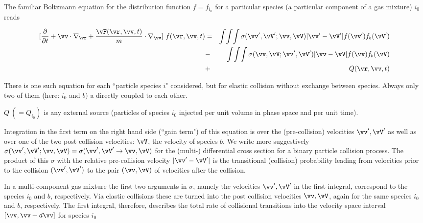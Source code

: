 The familiar Boltzmann
equation for the distribution function $f=f_{i_0}$ for a particular species (a particular component of a gas mixture) $i_0$
reads

\renewcommand{\theequation}{1.1a}
\begin{eqnarray} \label{eq1a}
\lbrack\frac\partial{\partial t} + \vv \cdot
\nabla_{\vr} +
\frac{\vF(\vr,\vv,t)}{m} \cdot
\nabla_{\vv}\rbrack \ f(\vr,\vv,t)
& = &
\int\!\int\!\int
\sigma(\vv',\vV';\vv,\vV)
|\vv'-\vV'| f(\vv')
f_b(\vV')  \nonumber \\
& - & \int\!\int\!\int
\sigma(\vv,\vV;\vv',\vV')
|\vv-\vV| f(\vv) f_b(\vV)
\nonumber \\  &+  & Q(\vr,\vv,t)
\end{eqnarray}

\renewcommand{\theequation}{\arabic{section}.\arabic{equation}}
There is one such equation for each ``particle species $i$" considered, but for elastic collision
without exchange between species. Always only two of them (here: $i_0$ and $b$) a directly coupled to each other.


$Q \ (= Q_{i_0})$ is any external source (particles of species $i_0$ injected per unit volume  in phase space and per unit time).
\

Integration in the first term on the right hand side (``gain term") of this equation is over the (pre-collision) velocities $\vv',
\vV'$  as well as over one of the two post collision velocities: $\vV$, the velocity of species $b$.
We write more suggestively  $\sigma(\vv',\vV'; \vv,\vV) = \sigma(\vv',\vV' \rightarrow \vv,\vV)$
for the (multi-) differential cross section for a binary particle collision process. The product of this $\sigma$ with the relative pre-collision velocity
$|\vv'-\vV'|$ is the transitional (collision) probability leading from velocities prior to the collision $(\vv',\vV')$ to the pair $(\vv,\vV)$ of velocities after the collision.

In a multi-component gas mixture the first two arguments in $\sigma$, namely the velocities
$\vv',\vV'$ in the first integral, correspond to the species $i_0$
and $b$, respectively. Via elastic collisions these are turned into
the post collision velocities $\vv, \vV$,
again for the same species $i_0$ and $b$, respectively. The first integral,
therefore, describes the total rate of collisional transitions
into the velocity space interval
$[\vv,\vv+d\vv]$ for species $i_0$

